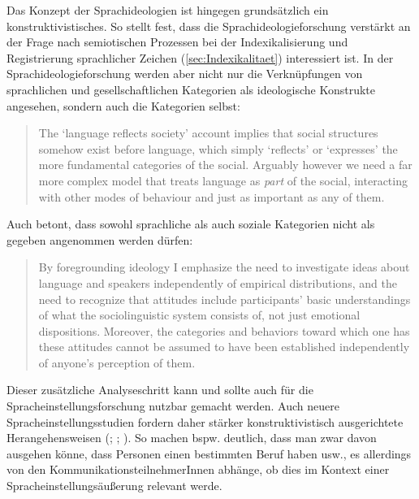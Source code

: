 Das Konzept der Sprachideologien ist hingegen grundsätzlich ein {konstruk\-ti\-vis\-tisches}. 
So stellt \citet[25]{Konig.2014} fest, dass die Sprachideologieforschung verstärkt an der Frage nach semiotischen Prozessen bei der Indexikalisierung und Registrierung sprachlicher Zeichen (\autoref{sec:Indexikalitaet}) interessiert ist. 
In der Sprachideologieforschung werden aber nicht nur die Verknüpfungen von sprachlichen und gesellschaftlichen Kategorien als ideologische Konstrukte angesehen, sondern auch die Kategorien selbst: 
\begin{quote}The `language reflects society' account implies that social structures somehow exist before language, which simply `reflects' or `expresses' the more fundamental categories of the social. Arguably however we need a far more complex model that treats language as \textit{part }of the social, interacting with other modes of behaviour and just as important as any of them.~\citep[81--82]{Cameron.1990}\end{quote}
Auch \citet{Irvine.2005} betont, dass sowohl sprachliche als auch soziale Kategorien nicht als gegeben angenommen werden dürfen: 
\begin{quote}By foregrounding ideology I emphasize the need to investigate ideas about language and speakers independently of empirical distributions, and the need to recognize that {\glq}attitudes{\grq} include participants' basic understandings of what the sociolinguistic system consists of, not just emotional dispositions. Moreover, the categories and behaviors toward which one has these attitudes cannot be assumed to have been established independently of anyone's perception of them.~\citep[24]{Irvine.2005}\end{quote}
Dieser zusätzliche Analyseschritt kann und sollte auch für die Spracheinstellungsforschung nutzbar gemacht werden.  
Auch neuere Spracheinstellungsstudien fordern daher stärker konstruktivistisch ausgerichtete Herangehensweisen (\citealp[s.][207]{Tophinke.2006}; \citealp[195]{Liebscher.2009}; \citealp[61--62]{Cuonz.2014}).
So machen bspw. \citet[213]{Tophinke.2006} deutlich, dass man zwar davon ausgehen könne, dass Personen einen bestimmten Beruf haben usw., es allerdings von den {Kom\-mu\-ni\-kations\-teil\-neh\-merIn\-nen} abhänge, ob dies im Kontext einer Spracheinstellungsäußerung relevant werde. 

